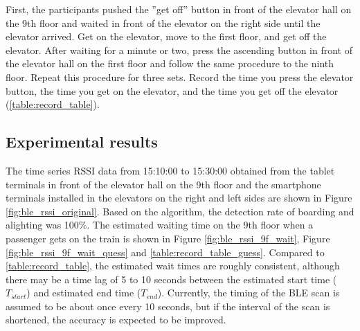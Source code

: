 \thispagestyle{guusuu}

First, the participants pushed the ''get off'' button in front of the elevator hall on the 9th floor and waited in front of the elevator on the right side until the elevator arrived. Get on the elevator, move to the first floor, and get off the elevator. After waiting for a minute or two, press the ascending button in front of the elevator hall on the first floor and follow the same procedure to the ninth floor. Repeat this procedure for three sets. Record the time you press the elevator button, the time you get on the elevator, and the time you get off the elevator (\tablename\ref{table:record_table}).


\subsection{Experimental results}

The time series RSSI data from 15:10:00 to 15:30:00 obtained from the tablet terminals in front of the elevator hall on the 9th floor and the smartphone terminals installed in the elevators on the right and left sides are shown in Figure \ref{fig:ble_rssi_original}.
Based on the algorithm, the detection rate of boarding and alighting was 100\%. The estimated waiting time on the 9th floor when a passenger gets on the train is shown in Figure \ref{fig:ble_rssi_9f_wait}, Figure \ref{fig:ble_rssi_9f_wait_quess} and \tablename\ref{table:record_table_guess}. Compared to \tablename\ref{table:record_table}, the estimated wait times are roughly consistent, although there may be a time lag of 5 to 10 seconds between the estimated start time ($T_{start}$) and estimated end time ($T_{end}$). Currently, the timing of the BLE scan is assumed to be about once every 10 seconds, but if the interval of the scan is shortened, the accuracy is expected to be improved.

\thispagestyle{kisuu}

